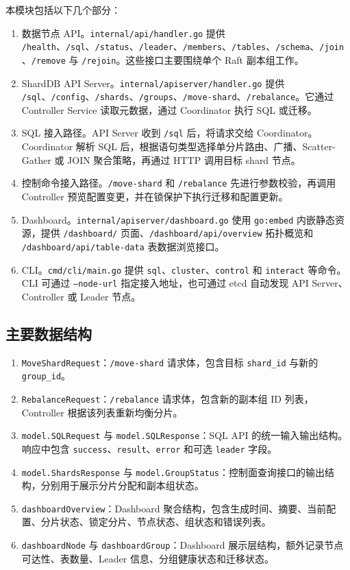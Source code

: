 \documentclass[UTF8,a4paper,12pt]{ctexart}
\begin{document}
本模块包括以下几个部分：
\begin{enumerate}
  \item 数据节点 API。\texttt{internal/api/handler.go} 提供 \texttt{/health}、\texttt{/sql}、\texttt{/status}、\texttt{/leader}、\texttt{/members}、\texttt{/tables}、\texttt{/schema}、\texttt{/join}、\texttt{/remove} 与 \texttt{/rejoin}。这些接口主要围绕单个 Raft 副本组工作。
  \item ShardDB API Server。\texttt{internal/apiserver/handler.go} 提供 \texttt{/sql}、\texttt{/config}、\texttt{/shards}、\texttt{/groups}、\texttt{/move-shard}、\texttt{/rebalance}。它通过 Controller Service 读取元数据，通过 Coordinator 执行 SQL 或迁移。
  \item SQL 接入路径。API Server 收到 \texttt{/sql} 后，将请求交给 Coordinator。Coordinator 解析 SQL 后，根据语句类型选择单分片路由、广播、Scatter-Gather 或 JOIN 聚合策略，再通过 HTTP 调用目标 shard 节点。
  \item 控制命令接入路径。\texttt{/move-shard} 和 \texttt{/rebalance} 先进行参数校验，再调用 Controller 预览配置变更，并在锁保护下执行迁移和配置更新。
  \item Dashboard。\texttt{internal/apiserver/dashboard.go} 使用 \texttt{go:embed} 内嵌静态资源，提供 \texttt{/dashboard/} 页面、\texttt{/dashboard/api/overview} 拓扑概览和 \texttt{/dashboard/api/table-data} 表数据浏览接口。
  \item CLI。\texttt{cmd/cli/main.go} 提供 \texttt{sql}、\texttt{cluster}、\texttt{control} 和 \texttt{interact} 等命令。CLI 可通过 \texttt{--node-url} 指定接入地址，也可通过 etcd 自动发现 API Server、Controller 或 Leader 节点。
\end{enumerate}

\subsection{主要数据结构}

\begin{enumerate}
  \item \texttt{MoveShardRequest}：\texttt{/move-shard} 请求体，包含目标 \texttt{shard\_id} 与新的 \texttt{group\_id}。
  \item \texttt{RebalanceRequest}：\texttt{/rebalance} 请求体，包含新的副本组 ID 列表，Controller 根据该列表重新均衡分片。
  \item \texttt{model.SQLRequest} 与 \texttt{model.SQLResponse}：SQL API 的统一输入输出结构。响应中包含 \texttt{success}、\texttt{result}、\texttt{error} 和可选 \texttt{leader} 字段。
  \item \texttt{model.ShardsResponse} 与 \texttt{model.GroupStatus}：控制面查询接口的输出结构，分别用于展示分片分配和副本组状态。
  \item \texttt{dashboardOverview}：Dashboard 聚合结构，包含生成时间、摘要、当前配置、分片状态、锁定分片、节点状态、组状态和错误列表。
  \item \texttt{dashboardNode} 与 \texttt{dashboardGroup}：Dashboard 展示层结构，额外记录节点可达性、表数量、Leader 信息、分组健康状态和迁移状态。
\end{enumerate}
\end{document}
